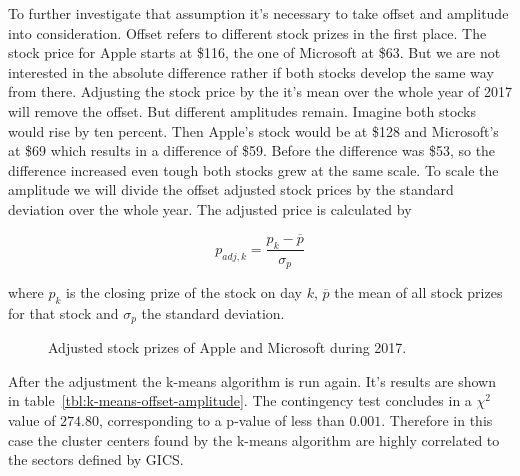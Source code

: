 To further investigate that assumption it's necessary to take offset and amplitude into consideration. Offset refers to different stock prizes in the first place. The stock price for Apple starts at \$116, the one of Microsoft at \$63. But we are not interested in the absolute difference rather if both stocks develop the same way from there. Adjusting the stock price by the it's mean over the whole year of 2017 will remove the offset. But different amplitudes remain. Imagine both stocks would rise by ten percent. Then Apple's stock would be at \$128 and Microsoft's at \$69 which results in a difference of \$59. Before the difference was \$53, so the difference increased even tough both stocks grew at the same scale. To scale the amplitude we will divide the offset adjusted stock prices by the standard deviation over the whole year. The adjusted price is calculated by 

\begin{equation}\label{eq:off-amp-adj}
	p_{adj, k} = \frac{p_k - \overline{p}}{\sigma_p}
\end{equation}

where $p_k$ is the closing prize of the stock on day $k$, $\overline{p}$ the mean of all stock prizes for that stock and $\sigma_p$ the standard deviation.

\begin{figure}\label{fig:appl-vs-msft_adj}
	\centering
	
	\caption{Adjusted stock prizes of Apple and Microsoft during 2017.}
\end{figure}

After the adjustment the k-means algorithm is run again. It's results are shown in table~\ref{tbl:k-means-offset-amplitude}. The contingency test concludes in a $\chi^2$ value of $274.80$, corresponding to a p-value of less than $0.001$. Therefore in this case the cluster centers found by the k-means algorithm are highly correlated to the sectors defined by GICS.




